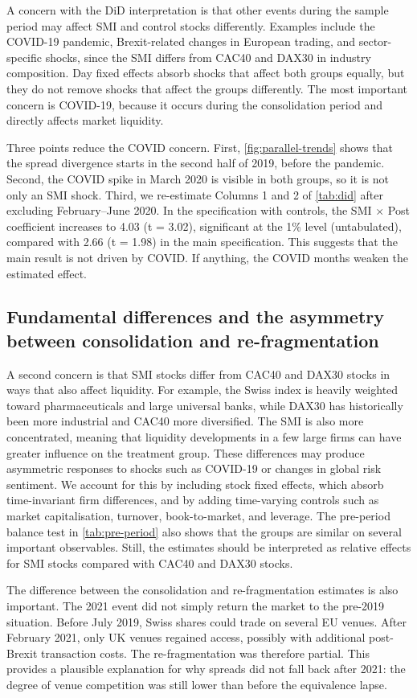 A concern with the DiD interpretation is that other events during the sample period may affect SMI and control stocks differently. Examples include the COVID-19 pandemic, Brexit-related changes in European trading, and sector-specific shocks, since the SMI differs from CAC40 and DAX30 in industry composition. Day fixed effects absorb shocks that affect both groups equally, but they do not remove shocks that affect the groups differently. The most important concern is COVID-19, because it occurs during the consolidation period and directly affects market liquidity.

Three points reduce the COVID concern. First, \autoref{fig:parallel-trends} shows that the spread divergence starts in the second half of 2019, before the pandemic. Second, the COVID spike in March 2020 is visible in both groups, so it is not only an SMI shock. Third, we re-estimate Columns 1 and 2 of \autoref{tab:did} after excluding February--June 2020. In the specification with controls, the SMI $\times$ Post coefficient increases to 4.03 (t = 3.02), significant at the 1\% level (untabulated), compared with 2.66 (t = 1.98) in the main specification. This suggests that the main result is not driven by COVID. If anything, the COVID months weaken the estimated effect.

\subsection{Fundamental differences and the asymmetry between consolidation and re-fragmentation}
\label{sec:fundamental-differences}

A second concern is that SMI stocks differ from CAC40 and DAX30 stocks in ways that also affect liquidity. For example, the Swiss index is heavily weighted toward pharmaceuticals and large universal banks, while DAX30 has historically been more industrial and CAC40 more diversified. The SMI is also more concentrated, meaning that liquidity developments in a few large firms can have greater influence on the treatment group. These differences may produce asymmetric responses to shocks such as COVID-19 or changes in global risk sentiment. We account for this by including stock fixed effects, which absorb time-invariant firm differences, and by adding time-varying controls such as market capitalisation, turnover, book-to-market, and leverage. The pre-period balance test in \autoref{tab:pre-period} also shows that the groups are similar on several important observables. Still, the estimates should be interpreted as relative effects for SMI stocks compared with CAC40 and DAX30 stocks.

The difference between the consolidation and re-fragmentation estimates is also important. The 2021 event did not simply return the market to the pre-2019 situation. Before July 2019, Swiss shares could trade on several EU venues. After February 2021, only UK venues regained access, possibly with additional post-Brexit transaction costs. The re-fragmentation was therefore partial. This provides a plausible explanation for why spreads did not fall back after 2021: the degree of venue competition was still lower than before the equivalence lapse.
